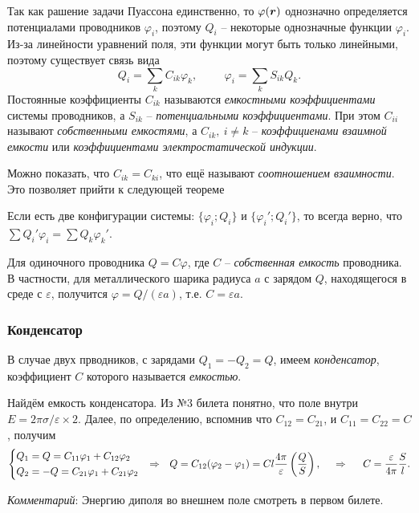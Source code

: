 Так как рашение задачи Пуассона единственно, то $\varphi(\mbox{\boldmath $r$})$ однозначно определяется потенциалами проводников $\varphi_i$, поэтому $Q_i$ -- некоторые однозначные функции $\varphi_i$. Из-за линейности уравнений поля, эти функции могут быть только линейными, поэтому существует связь вида
\begin{equation*}
    Q_i = \sum_k C_{ik} \varphi_k, \hspace{1cm} 
    \varphi_i = \sum_k S_{ik} Q_k.
\end{equation*}
Постоянные коэффициенты $C_{ik}$ называются \textit{емкостными коэффициентами} системы проводников, а $S_{ik}$ -- \textit{потенциальными коэффициентами}. При этом $C_{ii}$ называют \textit{собственными емкостями}, а $C_{ik}, \ i\neq k$ -- \textit{коэффициенами взаимной емкости} или \textit{коэффициентами электростатической индукции}.

Можно показать, что $C_{ik} = C_{ki}$, что ещё называют \textit{соотношением взаимности}. Это позволяет прийти к следующей теореме

\begin{to_thr}
     Если есть две конфигурации системы: $\{\varphi_i; Q_i\}$ и $\{\varphi_i'; Q_i'\}$, то всегда  верно, что
     $\sum Q_i' \varphi_i = \sum Q_k \varphi_k'$.
\end{to_thr}

Для одиночного проводника $Q = C\varphi$, где $C$ -- \textit{собственная емкость} проводника. В частности, для металлического шарика радиуса $a$ с зарядом $Q$, находящегося в среде с $\varepsilon$, получится $\varphi = Q / (\varepsilon a)$, т.е. $C = \varepsilon a$. 

\subsubsection*{Конденсатор}

В случае двух прводников, с зарядами $Q_1 = -Q_2 = Q$, имеем \textit{конденсатор}, коэффициент $C$ которого называется \textit{емкостью}.

Найдём емкость конденсатора. Из №3 билета понятно, что поле внутри $E = 2 \pi \sigma / \varepsilon \times 2$. Далее, по определению, вспомнив что $C_{12}=C_{21}$, и $C_{11}=C_{22} = C$, получим
\begin{equation}
    \left\{\begin{aligned}
        Q_1 &= Q = C_{11}\varphi_1 + C_{12}\varphi_2 \\
        Q_2 &= -Q= C_{21}\varphi_1 + C_{21}\varphi_2 \\
    \end{aligned}\right.
    \hspace{0.25cm} \overset{}{\Rightarrow}  \hspace{0.25cm} 
    Q = C_{12} (\varphi_2 - \varphi_1) = C l \frac{4\pi}{\varepsilon} \left(\frac{Q}{S} \right),
    \hspace{0.5cm} \Rightarrow \hspace{0.5cm} 
    C = \frac{\varepsilon}{4\pi} \frac{S}{l}.
\end{equation}

\phantom{42}

\noindent
\textit{Комментарий}: 
Энергию диполя во внешнем поле смотреть в первом билете. 

